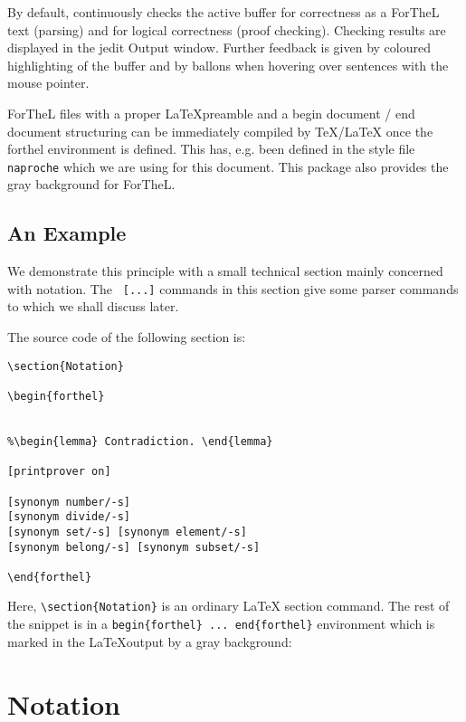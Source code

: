 \documentclass[11pt]{article}
\begin{document}
By default, \Naproche continuously checks the active buffer for correctness
as a ForTheL text (parsing) and for logical correctness (proof checking).
Checking results are displayed in the jedit Output window.
Further feedback is given by coloured highlighting of the buffer and by
ballons when hovering over sentences with the mouse pointer.

ForTheL files with a proper \LaTeX preamble and a begin document
/ end document structuring can be immediately compiled by \TeX/\LaTeX
once the forthel environment is defined. This has, e.g. been defined in the style
file \verb_naproche_ which we are using for this document. This package
also provides the gray background for ForTheL.

\subsection{An Example}

We demonstrate this principle with a small technical section
mainly concerned with notation. The \verb+ [...]+ commands in
this section give some parser commands to \Naproche which we shall
discuss later.

The source code of the following section is:
\begin{verbatim}
\section{Notation}

\begin{forthel}


%\begin{lemma} Contradiction. \end{lemma}

[printprover on]

[synonym number/-s]
[synonym divide/-s]
[synonym set/-s] [synonym element/-s]
[synonym belong/-s] [synonym subset/-s]

\end{forthel}
\end{verbatim}

Here, \verb+\section{Notation}+ is an ordinary \LaTeX
section command. The rest of the snippet is in a
{\verb_begin{forthel} ... end{forthel}_} environment
which is marked in the \LaTeX output by
a gray background:

\section{Notation}
\end{document}
